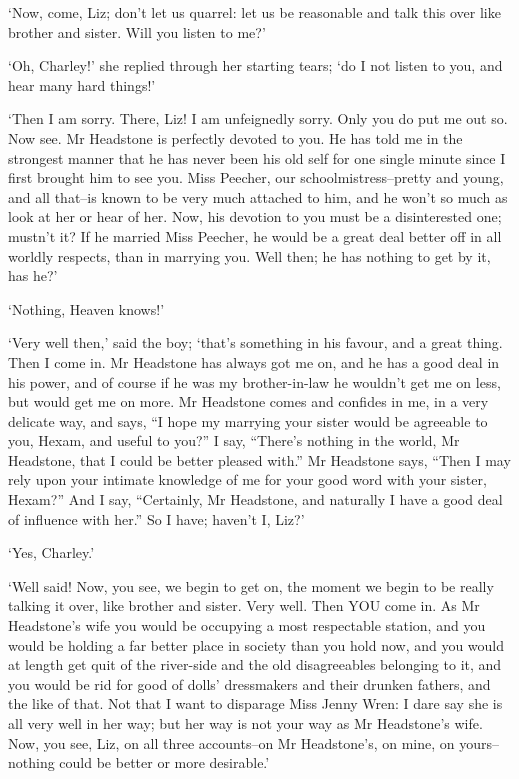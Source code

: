 ‘Now, come, Liz; don’t let us quarrel: let us be reasonable and talk
this over like brother and sister. Will you listen to me?’

‘Oh, Charley!’ she replied through her starting tears; ‘do I not listen
to you, and hear many hard things!’

‘Then I am sorry. There, Liz! I am unfeignedly sorry. Only you do put me
out so. Now see. Mr Headstone is perfectly devoted to you. He has told
me in the strongest manner that he has never been his old self for one
single minute since I first brought him to see you. Miss Peecher, our
schoolmistress--pretty and young, and all that--is known to be very much
attached to him, and he won’t so much as look at her or hear of her.
Now, his devotion to you must be a disinterested one; mustn’t it? If he
married Miss Peecher, he would be a great deal better off in all worldly
respects, than in marrying you. Well then; he has nothing to get by it,
has he?’

‘Nothing, Heaven knows!’

‘Very well then,’ said the boy; ‘that’s something in his favour, and a
great thing. Then I come in. Mr Headstone has always got me on, and he
has a good deal in his power, and of course if he was my brother-in-law
he wouldn’t get me on less, but would get me on more. Mr Headstone
comes and confides in me, in a very delicate way, and says, “I hope my
marrying your sister would be agreeable to you, Hexam, and useful to
you?” I say, “There’s nothing in the world, Mr Headstone, that I could
be better pleased with.” Mr Headstone says, “Then I may rely upon your
intimate knowledge of me for your good word with your sister, Hexam?”
 And I say, “Certainly, Mr Headstone, and naturally I have a good deal of
influence with her.” So I have; haven’t I, Liz?’

‘Yes, Charley.’

‘Well said! Now, you see, we begin to get on, the moment we begin to
be really talking it over, like brother and sister. Very well. Then
YOU come in. As Mr Headstone’s wife you would be occupying a most
respectable station, and you would be holding a far better place in
society than you hold now, and you would at length get quit of the
river-side and the old disagreeables belonging to it, and you would be
rid for good of dolls’ dressmakers and their drunken fathers, and the
like of that. Not that I want to disparage Miss Jenny Wren: I dare
say she is all very well in her way; but her way is not your way as
Mr Headstone’s wife. Now, you see, Liz, on all three accounts--on
Mr Headstone’s, on mine, on yours--nothing could be better or more
desirable.’

